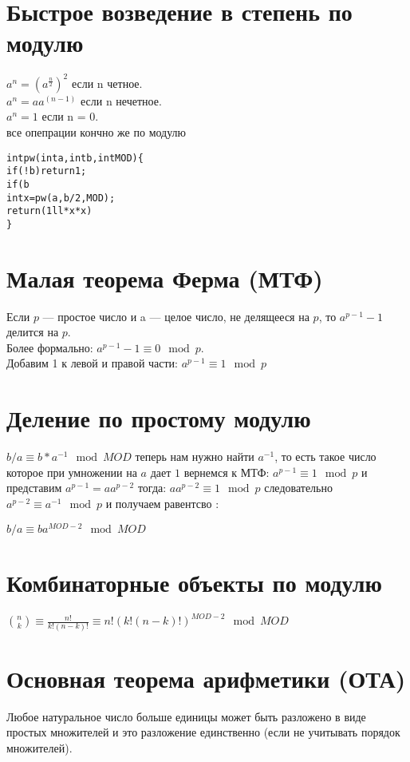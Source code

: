 \documentclass[10pt]{article}
\begin{document}
    \section{Быстрое возведение в степень по модулю}
        $a ^ n = {(a ^ \frac{n}{2})}^ 2$ если n четное.
        \\
        $a ^ n = {a  a ^ {(n - 1)}}$ если n нечетное.
        \\
        $a^n = 1$ если n = 0.
        \\
        все опепрации кончно же по модулю
    \begin{alltt}
int pw(int a, int b, int MOD)\{
    if(!b) return 1;
    if(b % 2) return (1ll * a * pw(a ,  b - 1 , MOD)) % MOD;
    int x = pw(a , b / 2, MOD);
    return (1ll * x * x) % MOD;
\}
    \end{alltt}
    
    \section{Малая теорема Ферма (МТФ)}
    Если $p$ — простое число и a — целое число, не делящееся на $p$, то $a^{p-1}-1$ делится на $p$.
    \\
    Более формально: $a^{p - 1} - 1 \equiv 0 \mod p$.
    \\
    Добавим 1 к левой и правой части: $a^{p - 1} \equiv 1 \mod p$
    
    \section{Деление по простому модулю}
    $b / a  \equiv b * a ^ {-1} \mod MOD$
    теперь нам нужно найти $a^{-1}$, то есть такое число которое при умножении на $a$ дает $1$
    вернемся к МТФ: $a^{p - 1} \equiv 1 \mod p$ и представим $a^{p - 1} = aa^{p - 2}$ тогда:
    $aa^{p - 2} \equiv 1 \mod p$ следовательно $a^{p-2} \equiv a^{-1} \mod p $
    и получаем равентсво : 
    
    \begin{center}
        $b / a \equiv ba^{MOD - 2} \mod MOD $
    \end{center}
    
    \section{Комбинаторные объекты по модулю}
    $\binom{n}{k} \equiv \frac{n!}{k!(n-k)!} \equiv n!(k!(n-k)!)^{MOD-2} \mod MOD$ 
    
    \section{Основная теорема арифметики (ОТА)}
    Любое натуральное число больше единицы может быть разложено в виде простых множителей и это разложение единственно (если не учитывать порядок множителей).
\end{document}
